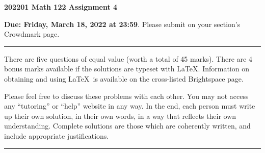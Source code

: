 \documentclass[11 pt]{article}%
\begin{document}
\begin{center}
\textbf{{\Large 202201 Math 122 Assignment 4}}
\end{center}

\medskip\noindent\textbf{Due:  Friday, March 18, 2022 at 23:59}.  Please submit on your section's Crowdmark page.

\bigskip\hrule\medskip\noindent There are five questions of equal value (worth a total of 45 marks).   There are 4 bonus marks available if the solutions are typeset with \LaTeX.  Information on obtaining and using \LaTeX\ is available on the cross-listed Brightspace page.

\medskip\noindent
Please feel free to discuss these problems with each other.  
You may not  access  any ``tutoring'' or ``help'' website in any way. 
In the end, each person must write up their own solution, in their own words, in a way that reflects their own understanding.   Complete solutions are those which are coherently written, and include appropriate justifications.


\medskip\hrule
\end{document}
